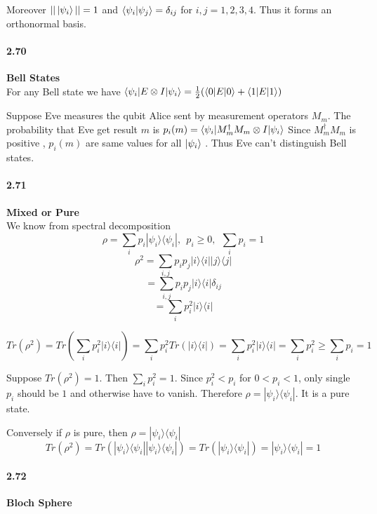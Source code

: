 Moreover $||\ket{\psi_i}|| = 1$ and $\braket{\psi_i|\psi_j} = \delta_{ij}$ for $i, j = 1,2,3,4$. Thus it forms an orthonormal basis.

\paragraph{2.70} \textbf{Bell States}%
\\
For any Bell state we have $ \braket{\psi_i| E \otimes I|\psi_i} = \frac{1}{2}(\braket{0|E|0} + \braket{1|E|1})$

Suppose Eve measures the qubit Alice sent by measurement operators $M_m$. The probability that Eve get result $m$ is $p_i(m) = \braket{\psi_i|M_m^{\dagger} M_m \otimes I | \psi_i}$ Since $M_m^{\dagger}M_m$ is positive , $p_i(m)$ are same values for all $\ket{\psi_i}$ . Thus Eve can't distinguish Bell states.


\paragraph{2.71} \textbf{Mixed or Pure}%
\\
 We know from spectral decomposition
 $$ \rho = \sum_i p_i  |\psi_i\rangle \langle\psi_i|, \ \ p_i \ge 0 , \ \ \sum_i p_i = 1$$
$$ \rho^2 = \sum_{i,j} p_i p_j |i\rangle \langle i|  |j\rangle \langle j|$$
$$ = \sum_{i,j} p_i p_j  |i\rangle \langle i| \delta_{ij}$$
$$ = \sum_i p_i^2  |i\rangle \langle i|$$

$$ Tr(\rho^2) = Tr(\sum_i p_i^2  |i\rangle \langle i|) = \sum_i p_i^2 Tr( |i\rangle \langle i|) = \sum_i p_i^2  |i\rangle \langle i| = \sum_i p_i^2 \ge \sum_i p_i = 1$$

Suppose $Tr(\rho^2) = 1$. Then $\sum_i p_i^2 = 1$. Since $p_i^2 < p_i$ for $0 < p_i < 1$, only single $p_i $ should be $1$ and otherwise have to vanish. Therefore $\rho =  |\psi_i\rangle \langle \psi_i|$. It is a pure state.

Conversely if $\rho$ is pure, then $\rho =  |\psi_i\rangle \langle \psi_i|$
$$ Tr(\rho^2) = Tr( |\psi_i\rangle \langle \psi_i| |\psi_i\rangle \langle \psi_i|) = Tr( |\psi_i\rangle \langle \psi_i|) =  |\psi_i\rangle \langle \psi_i| = 1$$


\paragraph{2.72} \textbf{Bloch Sphere}%
\\

